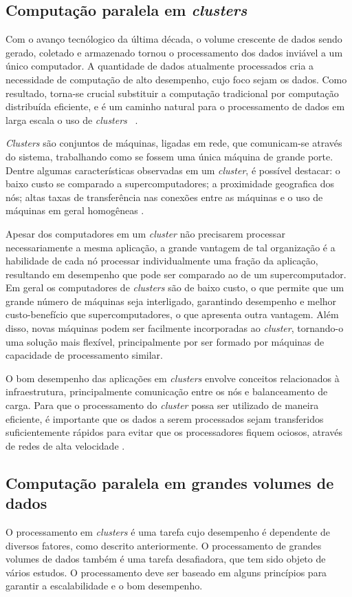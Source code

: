 \subsection{Computação paralela em \textit{clusters}}
Com o avanço tecnólogico da última década, o volume crescente de dados sendo gerado, coletado e armazenado tornou o processamento dos dados inviável a um único computador. A quantidade de dados atualmente processados cria a necessidade de computação de alto desempenho, cujo foco sejam os dados.  Como resultado, torna-se crucial substituir a computação tradicional por computação distribuída eficiente, e é um caminho natural para o processamento de dados em larga escala o uso de \textit{clusters} ~\cite{Lin:2010}.

\textit{Clusters} são conjuntos de máquinas, ligadas em rede, que comunicam-se através do sistema, trabalhando como se fossem uma única máquina de grande porte. 
Dentre algumas características observadas em um \textit{cluster}, é possível destacar: o baixo custo se comparado a supercomputadores; a proximidade geografica dos nós; altas taxas de transferência nas conexões entre as máquinas e o uso de máquinas em geral homogêneas \cite{Toth:2008}.

Apesar dos computadores em um \textit{cluster} não precisarem processar necessariamente a mesma aplicação, a grande vantagem de tal organização é a habilidade de cada nó processar individualmente uma fração da aplicação, resultando em desempenho que pode ser comparado ao de um supercomputador.
Em geral os computadores de \textit{clusters} são de baixo custo, o que permite que um grande número de máquinas seja interligado, garantindo desempenho e melhor custo-benefício que supercomputadores, o que apresenta outra vantagem. Além disso, novas máquinas podem ser facilmente incorporadas  ao \textit{cluster}, tornando-o uma solução mais flexível, principalmente por ser formado por máquinas de capacidade de processamento similar.

O bom desempenho das aplicações em \textit{clusters} envolve conceitos relacionados à infraestrutura, principalmente comunicação entre os nós e balanceamento de carga.
Para que o processamento do \textit{cluster} possa ser utilizado de maneira eficiente, é importante que os dados a serem processados sejam transferidos suficientemente rápidos para evitar que os processadores fiquem ociosos, através de redes de alta velocidade \cite{Rauber:2010}. 


\subsection{Computação paralela em grandes volumes de dados}
O processamento em \textit{clusters} é uma tarefa cujo desempenho é dependente de diversos fatores, como descrito anteriormente. O processamento de grandes volumes de dados também é uma tarefa desafiadora, que tem sido objeto de vários estudos. O processamento deve ser baseado em alguns princípios para garantir a escalabilidade e o bom desempenho.


